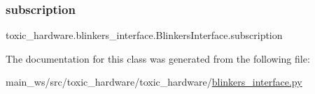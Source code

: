 \subsubsection{\texorpdfstring{subscription}{subscription}}
{\footnotesize\ttfamily toxic\+\_\+hardware.\+blinkers\+\_\+interface.\+Blinkers\+Interface.\+subscription}



The documentation for this class was generated from the following file\+:\begin{DoxyCompactItemize}
\item 
main\+\_\+ws/src/toxic\+\_\+hardware/toxic\+\_\+hardware/\mbox{\hyperlink{blinkers__interface_8py}{blinkers\+\_\+interface.\+py}}\end{DoxyCompactItemize}
